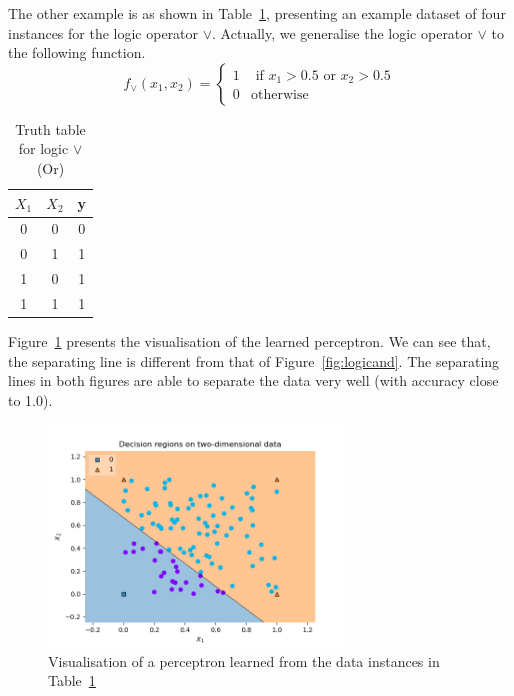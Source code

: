 \begin{example}
The other example is as shown in  Table~\ref{tab:truthtableor}, presenting  an example dataset of four instances for the logic operator $\lor$. Actually, we generalise the logic operator $\lor $ to the following function. 
\begin{equation}
    f_\lor(x_1,x_2) = 
    \begin{cases}
    1 & \text{ if } x_1 > 0.5 \text{ or } x_2 > 0.5 \\
    0 & \text{otherwise}
    \end{cases}
\end{equation}

\begin{table}[!htbp]
    \centering
    \begin{tabular}{|c|c||c|}
    \hline
     $X_1$  &  $X_2$   &  \textbf{y} \\
     \hline
      0     & 0  & 0 \\
      0 & 1 & 1 \\
      1 & 0 & 1 \\
      1 & 1 & 1 \\
      \hline
    \end{tabular}
    \caption{Truth table for logic $\lor$ (Or)}
    \label{tab:truthtableor}
\end{table}
Figure~\ref{fig:logicor} presents the visualisation of the learned perceptron. We can see that,  the separating line is different from that of Figure~\ref{fig:logicand}. The separating lines in both figures are able to separate the data very well (with accuracy close to 1.0). 
\begin{figure}[!htbp]
    \centering
    \includegraphics[width=0.7\textwidth]{images/deepLearning/Perceptron/logicor.png}
    \caption{Visualisation of a perceptron learned from the data instances in Table~\ref{tab:truthtableor}}
    \label{fig:logicor}
\end{figure}
\end{example}

